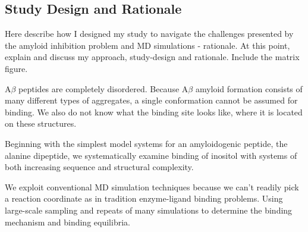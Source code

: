 \subsection{Study Design and Rationale}
\begin{outline}
	\1 Here describe how I designed my study to navigate the challenges presented by the amyloid inhibition problem and MD simulations - rationale. At this point, explain and discuss my approach, study-design and rationale. Include the matrix figure.


	\1 A$\beta$ peptides are completely disordered.  Because A$\beta$ amyloid formation consists of many different types of aggregates, a single conformation cannot be assumed for binding.  We also do not know what the binding site looks like, where it is located on these structures.

	\1 Beginning with the simplest model systems for an amyloidogenic peptide, the alanine dipeptide, we systematically examine binding of inositol with systems of both increasing sequence and structural complexity.

	\1 We exploit conventional MD simulation techniques because we can't readily pick a reaction coordinate as in tradition enzyme-ligand binding problems. Using large-scale sampling and repeats of many simulations to determine the binding mechanism and binding equilibria.	
\end{outline}


